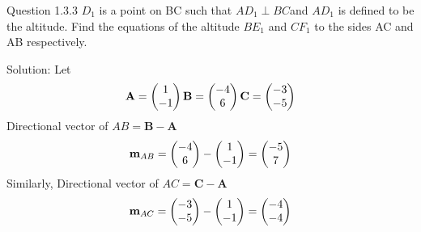\documentclass[12pt]{article}
\begin{document}
\let\vec\mathbf

Question 1.3.3 $D_{1}$ is a point on BC such that
$AD_{1}\perp BC$and $AD_{1} $ is defined to be the altitude.
Find the equations of the altitude $BE_{1} $ and $CF_{1}$
to the sides AC and AB respectively.

  
{Solution}:
Let 
\begin{align}\vec{A}=\myvec{1\\-1\\}
\vec{B}=\myvec{-4 \\6 \\}
\vec{C}=\myvec{-3\\-5\\}
\end{align}
Directional vector of $AB=\vec{B}-\vec{A}$
\begin{align}
\vec{m}_{AB}=\myvec{-4\\6\\}
-\myvec{1\\-1 \\}
=\myvec{-5\\7\\}
\end{align}
Similarly,
Directional vector of $AC=\vec{C}-\vec{A}$
\begin{align}
\vec{m}_{AC}=\myvec{-3\\-5\\}
-\myvec{1\\-1\\}
=\myvec{-4\\-4\\}
\end{align}
\end{document}
